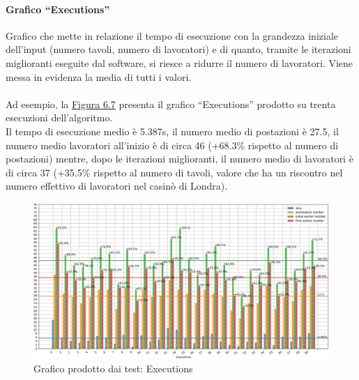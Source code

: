     \paragraph{Grafico ``Executions''} Grafico che mette in relazione il tempo di esecuzione con la grandezza iniziale dell’input (numero tavoli, numero di lavoratori) e di quanto, tramite le iterazioni miglioranti eseguite dal software, si riesce a ridurre il numero di lavoratori. Viene messa in evidenza la media di tutti i valori.\\
    \\
    Ad esempio, la \hyperref[fig67]{Figura 6.7} presenta il grafico ``Executions'' prodotto su trenta esecuzioni dell’algoritmo.\\ Il tempo di esecuzione medio è 5.387s, il numero medio di postazioni è 27.5, il numero medio lavoratori all’inizio è di circa 46 (+68.3\% rispetto al numero di postazioni) mentre, dopo le iterazioni miglioranti, il numero medio di lavoratori è di circa 37 (+35.5\% rispetto al numero di tavoli, valore che ha un riscontro nel numero effettivo di lavoratori nel casinò di Londra).
    
    \begin{figure}
        \centering
        \includegraphics[width=21cm, keepaspectratio]{../immagini/executions.png}
        \caption{Grafico prodotto dai test: Executions}\label{fig67}
    \end{figure}
    \FloatBarrier
    \noindent 
    
